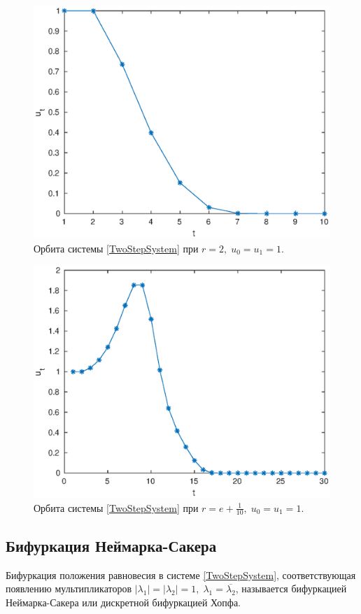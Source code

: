 \begin{figure}[h]
        \centering
        \includegraphics[width=0.8\linewidth]{second_discrete_system/stability_r2.eps}
        \caption{Орбита системы \ref{TwoStepSystem} при $r = 2,\; u_0 = u_1 = 1$.}
\end{figure}
\begin{figure}[h]
        \centering
        \includegraphics[width=0.8\linewidth]{second_discrete_system/stability_replus0-1.eps}
        \caption{Орбита системы \ref{TwoStepSystem} при $r = e + \frac{1}{10},\; u_0 = u_1 = 1$.}
\end{figure}

        \subsection{Бифуркация Неймарка-Сакера}
            \begin{definition}
                Бифуркация положения равновесия в системе \ref{TwoStepSystem}, соответствующая появлению мультипликаторов $|\lambda_1| = |\lambda_2| = 1,\;\lambda_1 = \overline{\lambda_2}$, называется бифуркацией Неймарка-Сакера или дискретной бифуркацией Хопфа. \cite[стр.~252]{bratus10}
            \end{definition}

